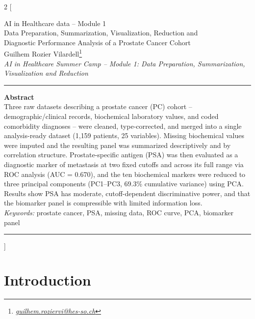 ﻿\documentclass[a4paper,10pt]{article}
\begin{document}
\begin{multicols*}{2}
[
\begin{center}
\vspace*{0mm}
{\large
AI in Healthcare data -- Module 1\\
\vspace{3mm}
Data Preparation, Summarization, Visualization, Reduction and \\
Diagnostic Performance Analysis of a Prostate Cancer Cohort
}\\
\vspace{8mm}
Guilhem Rozier Vilardell\footnote{\textit{\href{mailto:guilhem.roziervi@hes-so.ch}{guilhem.roziervi@hes-so.ch}}}
\\
\vspace{3mm}
\footnotesize{
\textit{AI in Healthcare Summer Camp -- Module 1: Data Preparation, Summarization, Visualization and Reduction}
}\\
\vspace{9mm}
\end{center}
\rule{\linewidth}{0.4pt}
\onehalfspacing
\textbf{Abstract}\\
Three raw datasets describing a prostate cancer (PC) cohort -- demographic/clinical records, biochemical laboratory values, and coded comorbidity diagnoses -- were cleaned, type-corrected, and merged into a single analysis-ready dataset (1{,}159 patients, 25 variables). Missing biochemical values were imputed and the resulting panel was summarized descriptively and by correlation structure. Prostate-specific antigen (PSA) was then evaluated as a diagnostic marker of metastasis at two fixed cutoffs and across its full range via ROC analysis (AUC = 0.670), and the ten biochemical markers were reduced to three principal components (PC1--PC3, 69.3\% cumulative variance) using PCA. Results show PSA has moderate, cutoff-dependent discriminative power, and that the biomarker panel is compressible with limited information loss.\\
\noindent\textit{Keywords:} prostate cancer, PSA, missing data, ROC curve, PCA, biomarker panel\\
\rule{\linewidth}{0.4pt}
]
\singlespacing

\tableofcontents

\setlength{\parskip}{1pt}
\columnbreak
\section{Introduction}


\end{multicols*}
\end{document}
